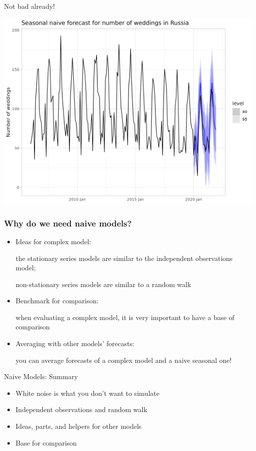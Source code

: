 	


\begin{frame}{Not bad already!}
	
	\includegraphics[width=\textwidth]{pictures/om_ts_01-162.png}
	
	
\end{frame}


\begin{frame}
	\frametitle{Why do we need naive models?}
	
	\begin{itemize}[<+->]
		\item \alert{Ideas} for complex model:
		
		the \alert{stationary series} models are similar to the independent observations model;
		
		\alert{non-stationary series} models are similar to a random walk
		
		\item \alert{Benchmark for comparison}:
		
		when evaluating a complex model, it is very important to have a base of comparison
		
		\item \alert{Averaging} with other models' forecasts:
		
		you can \alert{average forecasts} of a complex model and a naive seasonal one!
	\end{itemize}
	
	
\end{frame}

\begin{frame}{Naive Models: Summary}
	
	\begin{itemize}[<+->]
		\item White noise is what you don't want to simulate
		\item Independent observations and random walk
		\item Ideas, parts, and helpers for other models
		\item Base for comparison
	\end{itemize}
\end{frame}